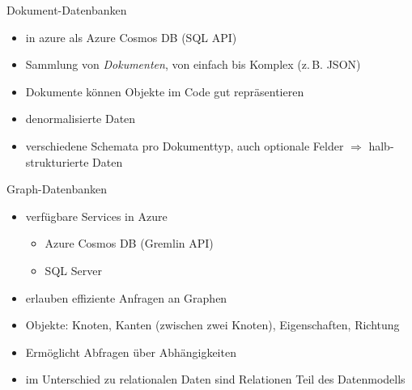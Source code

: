 \begin{flashcard}[Definition]{Dokument-Datenbanken}
  \begin{itemize}
    \item in azure als Azure Cosmos DB (SQL API)
    \item Sammlung von \emph{Dokumenten}, von einfach bis Komplex (z.\,B. JSON)
    \item Dokumente können Objekte im Code gut repräsentieren
    \item denormalisierte Daten
    \item verschiedene Schemata pro Dokumenttyp, auch optionale Felder\newline
      $\Rightarrow$ halb-strukturierte Daten
  \end{itemize}
\end{flashcard}

\begin{flashcard}[Definition]{Graph-Datenbanken}
  \begin{itemize}
    \item verfügbare Services in Azure
      \begin{itemize}
        \item Azure Cosmos DB (Gremlin API)
        \item SQL Server
      \end{itemize}
    \item erlauben effiziente Anfragen an Graphen
    \item Objekte: Knoten, Kanten (zwischen zwei Knoten), Eigenschaften, Richtung
    \item Ermöglicht Abfragen über Abhängigkeiten
    \item im Unterschied zu relationalen Daten sind Relationen Teil des Datenmodells
  \end{itemize}
\end{flashcard}

